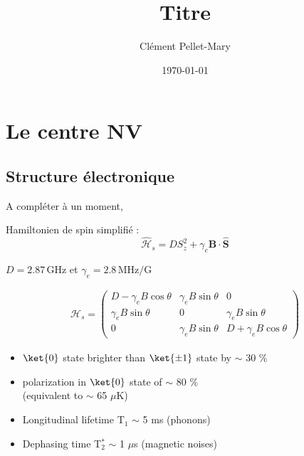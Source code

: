 \documentclass[a4paper]{report}
\title{Titre}
\author{Clément Pellet-Mary}
\date\today
\begin{document}
\chapter{Le centre NV}
  \section{Structure électronique}
  A compléter à un moment,
  
  Hamiltonien de spin simplifié : 
  \begin{equation*}
  \hat{\mathcal{H}}_s=D S_z^2 + \gamma_e \textbf{B}\cdot\hat{\textbf{S}}
  \end{equation*}
  \begin{center}
  $D=2.87 \,$GHz et $\gamma_e=2.8\,\mathrm{MHz}/\mathrm{G}$
\end{center}   
  
 \begin{gather*}
 {\mathcal{H}}_s
 =
 \begin{pmatrix}
 	D-\gamma_e B\cos \theta & \gamma_e B\sin \theta & 0 \\
 	\gamma_e B\sin \theta & 0 & \gamma_e B\sin \theta \\
 	0 & \gamma_e B\sin \theta & D+\gamma_e B\cos \theta
 \end{pmatrix}
 \end{gather*}
 
 \begin{itemize}
 \item $\ket{0}$ state brighter than $\ket{\pm 1}$ state by $\sim$ 30 \%
 \item polarization in $\ket{0}$ state of $\sim$ 80 \% \\(equivalent to $\sim$ 65 $\mu$K)
 \end{itemize}
 
 \begin{itemize}
 \item Longitudinal lifetime T$_1$ $\sim$ 5 ms (phonons)
 \item Dephasing time T$_2^*$ $\sim$ 1 $\mu$s (magnetic noises)
 \end{itemize}
  
\end{document}
